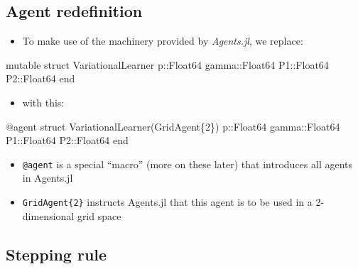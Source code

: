 \documentclass[
  letterpaper,
  DIV=11,
  numbers=noendperiod]{scrartcl}
\newenvironment{Shaded}{\begin{snugshade}}{\end{snugshade}}
\newcommand{\DataTypeTok}[1]{\textcolor[rgb]{0.68,0.00,0.00}{#1}}
\newcommand{\FloatTok}[1]{\textcolor[rgb]{0.68,0.00,0.00}{#1}}
\newcommand{\FunctionTok}[1]{\textcolor[rgb]{0.28,0.35,0.67}{#1}}
\newcommand{\KeywordTok}[1]{\textcolor[rgb]{0.00,0.23,0.31}{#1}}
\newcommand{\NormalTok}[1]{\textcolor[rgb]{0.00,0.23,0.31}{#1}}
\newcommand{\OperatorTok}[1]{\textcolor[rgb]{0.37,0.37,0.37}{#1}}
\newcommand{\PreprocessorTok}[1]{\textcolor[rgb]{0.68,0.00,0.00}{#1}}
\providecommand{\tightlist}{%
  \setlength{\itemsep}{0pt}\setlength{\parskip}{0pt}}\usepackage{longtable,booktabs,array}
\begin{document}
\subsection{Agent redefinition}\label{agent-redefinition}

\begin{itemize}
\tightlist
\item
  To make use of the machinery provided by \emph{Agents.jl}, we replace:
\end{itemize}

\begin{Shaded}
\begin{Highlighting}[]
\KeywordTok{mutable struct}\NormalTok{ VariationalLearner}
\NormalTok{  p}\OperatorTok{::}\DataTypeTok{Float64}
\NormalTok{  gamma}\OperatorTok{::}\DataTypeTok{Float64}
\NormalTok{  P1}\OperatorTok{::}\DataTypeTok{Float64}
\NormalTok{  P2}\OperatorTok{::}\DataTypeTok{Float64}
\KeywordTok{end}
\end{Highlighting}
\end{Shaded}

\begin{itemize}
\tightlist
\item
  with this:
\end{itemize}

\begin{Shaded}
\begin{Highlighting}[]
\PreprocessorTok{@agent} \KeywordTok{struct} \FunctionTok{VariationalLearner}\NormalTok{(GridAgent\{}\FloatTok{2}\NormalTok{\})}
\NormalTok{  p}\OperatorTok{::}\DataTypeTok{Float64}
\NormalTok{  gamma}\OperatorTok{::}\DataTypeTok{Float64}
\NormalTok{  P1}\OperatorTok{::}\DataTypeTok{Float64}
\NormalTok{  P2}\OperatorTok{::}\DataTypeTok{Float64}
\KeywordTok{end}
\end{Highlighting}
\end{Shaded}

\begin{itemize}
\tightlist
\item
  \texttt{@agent} is a special ``macro'' (more on these later) that
  introduces all agents in Agents.jl
\item
  \texttt{GridAgent\{2\}} instructs Agents.jl that this agent is to be
  used in a 2-dimensional grid space
\end{itemize}

\subsection{Stepping rule}\label{stepping-rule}
\end{document}
